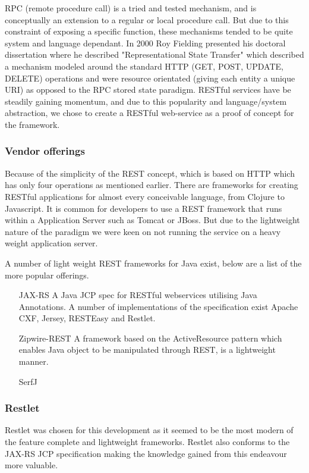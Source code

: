 \documentclass[pdftex,11pt,a4paper]{article}
\begin{document}
RPC (remote procedure call) is a tried and tested mechanism, and is conceptually an extension to a regular or local procedure call. But due to this constraint of exposing a specific function, these mechanisms tended to be quite system and language dependant. In 2000 Roy Fielding presented his doctoral dissertation where he described "Representational State Transfer"\cite{REST} which described a mechanism modeled around the standard HTTP (GET, POST, UPDATE, DELETE) operations and were resource orientated (giving each entity a unique URI) as opposed to the RPC stored state paradigm. RESTful services have be steadily gaining momentum, and due to this popularity and language/system abstraction, we chose to create a RESTful web-service as a proof of concept for the framework.

\subsubsection{Vendor offerings}
Because of the simplicity of the REST concept, which is based on HTTP which has only four operations as mentioned earlier. There are frameworks for creating RESTful applications for almost every conceivable language, from Clojure\cite{website:compojure-rest} to Javascript\cite{website:persevere}. It is common for developers to use a REST framework that runs within a Application Server such as Tomcat\cite{website:tomcat} or JBoss\cite{website:jboss}. But due to the lightweight nature of the paradigm we were keen on not running the service on a heavy weight application server.

A number of light weight REST frameworks for Java exist, below are a list of the more popular offerings.

\begin{enumerate}
	\item[JAX-RS] A Java JCP spec for RESTful webservices utilising Java Annotations. A number of implementations of the specification exist Apache CXF, Jersey, RESTEasy and Restlet.
	\item[Zipwire-REST] A framework based on the ActiveResource pattern which enables Java object to be manipulated through REST, is a lightweight manner.
	\item[SerfJ]
\end{enumerate}

\subsubsection{Restlet}
Restlet was chosen for this development as it seemed to be the most modern of the feature complete and lightweight frameworks. Restlet also conforms to the JAX-RS JCP specification\cite{website:jax-rs_jcp} making the knowledge gained from this endeavour more valuable.
\end{document}
